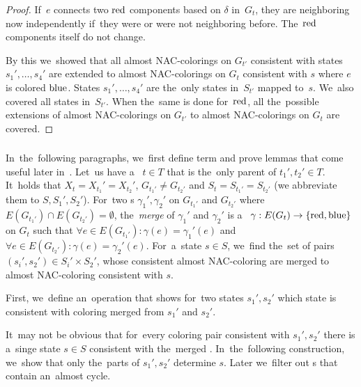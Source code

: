 \begin{proof}
	If~\( e \) connects two \( \text{red} \) components based on \( \delta \) in~\( G_t \),
	they are neighboring now independently if~they were or were not neighboring before.
	The~\( \text{red} \) components itself do not change.

	By this we~showed that all almost NAC-colorings on \( G_{t'} \) consistent with
	states \( s_1', \dots, s_4' \) are extended to almost NAC-colorings on \( G_t \)
	consistent with \( s \) where \( e \) is colored \( \text{blue} \).
	States \( s_1', \dots, s_4' \) are the~only states in~\( S_{t'} \) mapped to~\( s \).
	We~also covered all states in~\( S_{t'} \).
	When the~same is done for~\( \text{red} \), all the~possible extensions
	of almost NAC-colorings on \( G_{t'} \) to almost NAC-colorings on \( G_t \)
	are covered.
\end{proof}

\subsubsection*{\JoinNode{}}

In~the~following paragraphs,
we~first define term and prove lemmas
that come useful later in~.
%
Let~us have a~\JoinNode{} \( t \in T \) that is
the~only parent of \( t_1', t_2' \in T \).
It~holds that \( X_t = X_{t_1}' = X_{t_2}' \),
\( G_{t_1'} \ne G_{t_2'} \)
and \( S_t = S_{t_1'} = S_{t_2'} \)
(we abbreviate them to \( S, S_1', S_2' \)).
%
For~two \rbcol{}s \( \gamma_1', \gamma_2' \)
on \( G_{t_1'} \) and \( G_{t_2'} \)
where \( E(G_{t_1'}) \cap E(G_{t_2'}) = \emptyset \),
the~\emph{merge} of \( \gamma_1' \) and \( \gamma_2' \)
is a~\rbcol{} \( \gamma : E(G_t) \to \{ \text{red}, \text{blue} \} \) on \( G_t \)
such that \( \forall e \in E(G_{t_1'}) : \gamma(e) = \gamma_1'(e) \) and
\( \forall e \in E(G_{t_2'}) : \gamma(e) = \gamma_2'(e) \).
%
For~a~state \( s \in S \), we~find the~set of
pairs \( (s_i', s_2') \in S_i' \times S_2' \),
whose consistent almost NAC-coloring are merged
to almost NAC-coloring consistent with \( s \).

First, we~define an~operation that shows for~two states \( s_1', s_2' \)
which state is consistent with coloring merged from \( s_1' \) and \( s_2' \).
%
%
It~may not be obvious that for~every coloring pair consistent with \( s_1', s_2' \)
there is a~singe state \( s \in S \) consistent with the~merged \rbcol{}.
In~the~following construction, we~show that
only the~parts of \( s_1', s_2' \) determine \( s \).
Later we~filter out \rbcol{}s that contain an~almost cycle.

